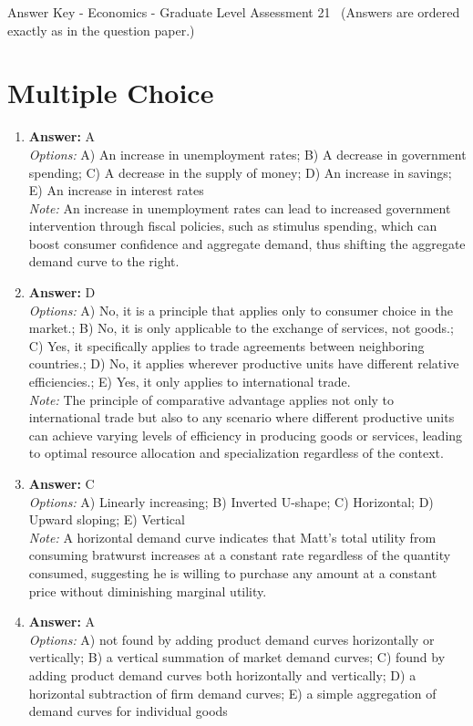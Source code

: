 \documentclass[12pt]{article}
\begin{document}
\begin{center}
Answer Key - Economics - Graduate Level Assessment 21 \
\small (Answers are ordered exactly as in the question paper.)
\end{center}

\section*{Multiple Choice}
\begin{enumerate}[label=\arabic*.]
\item \textbf{Answer:} A
\\ \textit{Options:} A) An increase in unemployment rates; B) A decrease in government spending; C) A decrease in the supply of money; D) An increase in savings; E) An increase in interest rates
\\ \textit{Note:} An increase in unemployment rates can lead to increased government intervention through fiscal policies, such as stimulus spending, which can boost consumer confidence and aggregate demand, thus shifting the aggregate demand curve to the right.
\item \textbf{Answer:} D
\\ \textit{Options:} A) No, it is a principle that applies only to consumer choice in the market.; B) No, it is only applicable to the exchange of services, not goods.; C) Yes, it specifically applies to trade agreements between neighboring countries.; D) No, it applies wherever productive units have different relative efficiencies.; E) Yes, it only applies to international trade.
\\ \textit{Note:} The principle of comparative advantage applies not only to international trade but also to any scenario where different productive units can achieve varying levels of efficiency in producing goods or services, leading to optimal resource allocation and specialization regardless of the context.
\item \textbf{Answer:} C
\\ \textit{Options:} A) Linearly increasing; B) Inverted U-shape; C) Horizontal; D) Upward sloping; E) Vertical
\\ \textit{Note:} A horizontal demand curve indicates that Matt's total utility from consuming bratwurst increases at a constant rate regardless of the quantity consumed, suggesting he is willing to purchase any amount at a constant price without diminishing marginal utility.
\item \textbf{Answer:} A
\\ \textit{Options:} A) not found by adding product demand curves horizontally or vertically; B) a vertical summation of market demand curves; C) found by adding product demand curves both horizontally and vertically; D) a horizontal subtraction of firm demand curves; E) a simple aggregation of demand curves for individual goods

\end{enumerate}
\end{document}
